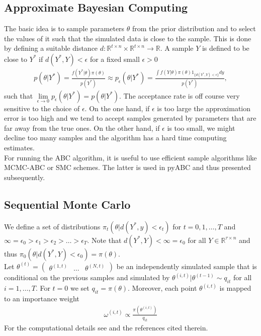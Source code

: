 \documentclass[11pt, a4paper, leqno]{article}
\begin{document}
\subsection{Approximate Bayesian Computing}
\label{subsec:abc}
The basic idea is to sample parameters $\theta$ from the prior distribution and to select the values of it such that the simulated data is close to the sample. This is done by defining a suitable distance  $d: \mathbb{R}^{t \times n} \times \mathbb{R}^{t \times n} \to \mathbb{R}$. A sample $Y$ is defined to be close to $Y^*$ if $d(Y^*, Y) < \epsilon$ for a fixed small $\epsilon > 0$
\begin{align}
    p(\theta|Y^*) = \frac{f(Y^*| \theta) \pi(\theta) }{p(Y^*)} \approx p_\epsilon(\theta|Y^*) =  \frac{\int  f(Y| \theta) \pi(\theta) 1_{\{d(Y^*,Y) < \epsilon\}} dy}{p(Y^*)},
\end{align}
such that $\lim\limits_{\epsilon \to 0} p_\epsilon(\theta|Y^*) = p(\theta|Y^*)$. The acceptance rate is off course very sensitive to the choice of $\epsilon$. On the one hand, if $\epsilon$ is too large the approximation error is too high and we tend to accept samples generated by parameters that are far away from the true ones. On the other hand, if $\epsilon$ is too small, we might decline too many samples and the algorithm has a hard time computing estimates. \\
For running the ABC algorithm, it is useful to use efficient sample algorithms like MCMC-ABC or SMC schemes. The latter is used in pyABC and thus presented subsequently.


\subsection{Sequential Monte Carlo}
\label{subsec:smc}
We define a set of distributions $\pi_{t}(\theta|d(Y^*,y) < \epsilon_t)$ for $t=0, 1, \dotsc, T$ and $\infty = \epsilon_0 > \epsilon_1 > \epsilon_2 > \dotsc > \epsilon_T$. Note that $d(Y^*,Y) < \infty = \epsilon_0$ for all $Y \in \mathbb{R}^{\tau \times n}$ and thus $\pi_{0}(\theta|d(Y^*,Y) < \epsilon_0) = \pi(\theta)$. \\
Let $\theta^{(t)} = \begin{pmatrix} \theta^{(1, t)} & \dotsc & \theta^{(N, t)} \end{pmatrix}$ be an independently simulated sample that is conditional on the previous samples and simulated by $\theta^{(i, t)}|\theta^{(t-1)} \sim q_{it}$ for all $i = 1,\dotsc, T $. For $t=0$ we set $q_{it} = \pi(\theta)$. Moreover, each point $\theta^{(i, t)}$ is mapped to an importance weight
\begin{align}
    \omega^{(i,t)} \propto \frac{\pi(\theta^{(i,t)})}{q_{it}}
\end{align}
For the computational details see \citet{klinger2018} and the references cited therein.
\end{document}
